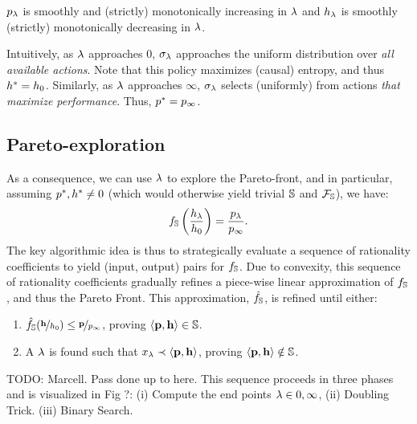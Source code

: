 \begin{proposition}
  $p_\lambda$ is smoothly and (strictly) monotonically increasing in $\lambda$ and $h_\lambda$
  is smoothly (strictly) monotonically decreasing in $\lambda$.
\end{proposition}

Intuitively, as $\lambda$ approaches $0$, $\sigma_\lambda$ approaches the
uniform distribution over \emph{all available actions}. Note that this
policy maximizes (causal) entropy, and thus $h^{*} = h_0$.
Similarly, as $\lambda$ approaches $\infty$, $\sigma_\lambda$ selects (uniformly) from
actions \emph{that maximize performance}. Thus, $p^{*} = p_\infty$.

\subsection{Pareto-exploration}
As a consequence, we can use $\lambda$ to explore the Pareto-front, and
in particular, assuming $p^{*}, h^{*} \neq 0$ (which would otherwise yield trivial
$\mathbb{S}$ and $\mathcal{F}_{\mathbb{S}}$), we have:
\begin{equation}
  f_\mathbb{S}\left(\frac{h_\lambda}{h_0}\right) = \frac{p_\lambda}{p_\infty}.
\end{equation}
The key algorithmic idea is thus to strategically evaluate a sequence
of rationality coefficients to yield (input, output) pairs for
$f_\mathbb{S}$. Due to convexity, this sequence of rationality
coefficients gradually refines a piece-wise linear approximation of
$f_\mathbb{S}$, and thus the Pareto Front. This approximation, $\hat{f_\mathbb{S}}$, is refined
until either:
\begin{enumerate}
  \item $\hat{f_\mathbb{S}}(\nicefrac{\mathbf{h}}{h_0}) \leq \nicefrac{\mathbf{p}}{p_\infty}$, proving $\langle \mathbf{p},
\mathbf{h} \rangle \in \mathbb{S}$.
\item A $\lambda$ is found such that $x_{\lambda} \prec \langle
\mathbf{p}, \mathbf{h} \rangle$, proving $\langle \mathbf{p},
\mathbf{h} \rangle \notin \mathbb{S}$.

\end{enumerate}

TODO: Marcell. Pass done up to here.
This sequence proceeds in three phases and is visualized in Fig ?:
(i) Compute the end points $\lambda \in {0, \infty}$, (ii) Doubling Trick.
(iii) Binary Search.

